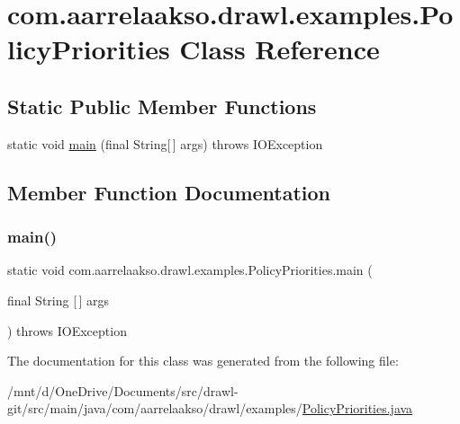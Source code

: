 \hypertarget{classcom_1_1aarrelaakso_1_1drawl_1_1examples_1_1_policy_priorities}{}\section{com.\+aarrelaakso.\+drawl.\+examples.\+Policy\+Priorities Class Reference}
\label{classcom_1_1aarrelaakso_1_1drawl_1_1examples_1_1_policy_priorities}
\subsection*{Static Public Member Functions}
\begin{DoxyCompactItemize}
\item 
static void \hyperlink{classcom_1_1aarrelaakso_1_1drawl_1_1examples_1_1_policy_priorities_a8e93196f3da008884909a2dabec04d3f}{main} (final String\mbox{[}$\,$\mbox{]} args)  throws I\+O\+Exception     
\end{DoxyCompactItemize}


\subsection{Member Function Documentation}
\mbox{\label{classcom_1_1aarrelaakso_1_1drawl_1_1examples_1_1_policy_priorities_a8e93196f3da008884909a2dabec04d3f}} 
\subsubsection{\texorpdfstring{main()}{main()}}
{\footnotesize\ttfamily static void com.\+aarrelaakso.\+drawl.\+examples.\+Policy\+Priorities.\+main (\begin{DoxyParamCaption}\item[{final String \mbox{[}$\,$\mbox{]}}]{args }\end{DoxyParamCaption}) throws I\+O\+Exception\hspace{0.3cm}{\ttfamily [static]}}



The documentation for this class was generated from the following file\+:\begin{DoxyCompactItemize}
\item 
/mnt/d/\+One\+Drive/\+Documents/src/drawl-\/git/src/main/java/com/aarrelaakso/drawl/examples/\hyperlink{_policy_priorities_8java}{Policy\+Priorities.\+java}\end{DoxyCompactItemize}
